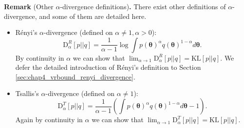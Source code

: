 \vspace{1em}
\begin{tcolorbox}
\textbf{Remark} (Other $\alpha$-divergence definitions)\textbf{.}
There exist other definitions of $\alpha$-divergence, and some of them are detailed here.
\begin{itemize}
\item R{\'e}nyi's $\alpha$-divergence \citep{renyi:divergence1961} (defined on $\alpha \neq 1, \alpha > 0$):
$$\mathrm{D}_{\alpha}^{R}[p||q] = \frac{1}{\alpha - 1} \log \int p(\bm{\theta})^{\alpha} q(\bm{\theta})^{1 - \alpha} d\bm{\theta}.$$
By continuity in $\alpha$ we can show that $\lim_{\alpha \rightarrow 1} \mathrm{D}_{\alpha}^{R}[p||q] = \mathrm{KL}[p||q]$. We defer the detailed introduction of R{\'e}nyi's definition to Section \ref{sec:chap4_vrbound_renyi_divergence}.
%
\item Tsallis's $\alpha$-divergence \citep{tsallis:divergence1988} (defined on $\alpha \neq 1$):
$$\mathrm{D}_{\alpha}^{T}[p||q] = \frac{1}{\alpha - 1} \left( \int p(\bm{\theta})^{\alpha} q(\bm{\theta})^{1 - \alpha} d\bm{\theta} - 1\right).$$ 
Again by continuity in $\alpha$ we can show that $\lim_{\alpha \rightarrow 1} \mathrm{D}_{\alpha}^{T}[p||q] = \mathrm{KL}[p||q]$. 
%
\end{itemize}

\end{tcolorbox}
